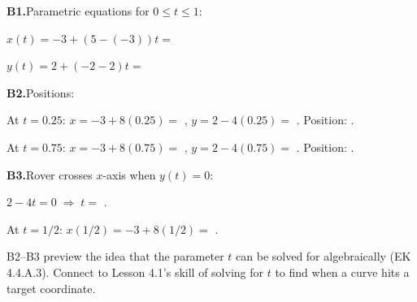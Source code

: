 \documentclass[10pt]{article}
\begin{document}
\begin{tcolorbox}[colback=white, colframe=black!40,
    title=\textbf{Tier E --- Extension},
    fonttitle=\bfseries, arc=2mm, left=3mm, right=3mm, top=2mm, bottom=2mm]

\textbf{B1.}\quad Parametric equations for $0 \le t \le 1$:

$x(t) = -3 + (5-(-3))t = $ 

$y(t) = 2 + (-2-2)t = $ 

\vspace{0.04in}
\textbf{B2.}\quad Positions:

At $t = 0.25$: $x = -3 + 8(0.25) = $ , $y = 2 - 4(0.25) = $ . Position: .

At $t = 0.75$: $x = -3 + 8(0.75) = $ , $y = 2 - 4(0.75) = $ . Position: .

\vspace{0.04in}
\textbf{B3.}\quad Rover crosses $x$-axis when $y(t) = 0$:

$2 - 4t = 0 \;\Rightarrow\; t = $ .

At $t = 1/2$: $x(1/2) = -3 + 8(1/2) = $ .


\begin{teachernote}
  B2--B3 preview the idea that the parameter $t$ can be solved for
  algebraically (EK 4.4.A.3). Connect to Lesson 4.1's skill of solving
  for $t$ to find when a curve hits a target coordinate.
\end{teachernote}

\end{tcolorbox}
\end{document}

